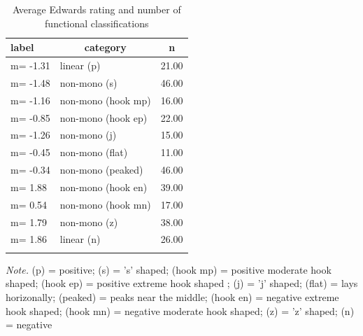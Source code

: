 \documentclass[
  ,jou]{apa6}
\begin{document}
\begin{table}[tbp]

\begin{center}
\begin{threeparttable}

\caption{\label{tab:qsorttable}Average Edwards rating and number of functional classifications}

\begin{tabular}{lll}
\toprule
label & \multicolumn{1}{c}{category} & \multicolumn{1}{c}{n}\\
\midrule
m= -1.31 & linear (p) & 21.00\\
m= -1.48 & non-mono (s) & 46.00\\
m= -1.16 & non-mono (hook mp) & 16.00\\
m= -0.85 & non-mono (hook ep) & 22.00\\
m= -1.26 & non-mono (j) & 15.00\\
m= -0.45 & non-mono (flat) & 11.00\\
m= -0.34 & non-mono (peaked) & 46.00\\
m= 1.88 & non-mono (hook en) & 39.00\\
m= 0.54 & non-mono (hook mn) & 17.00\\
m= 1.79 & non-mono (z) & 38.00\\
m= 1.86 & linear (n) & 26.00\\
\bottomrule
\addlinespace
\end{tabular}

\begin{tablenotes}[para]
\normalsize{\textit{Note.} (p) = positive; (s) = 's' shaped; (hook mp) = positive moderate hook shaped; (hook ep) = positive extreme hook shaped ; (j) = 'j' shaped; (flat) = lays horizonally; (peaked) =  peaks near the middle; (hook en) = negative extreme hook shaped; (hook mn) = negative moderate hook shaped; (z) = 'z' shaped; (n) = negative
}
\end{tablenotes}

\end{threeparttable}
\end{center}

\end{table}
\end{document}
